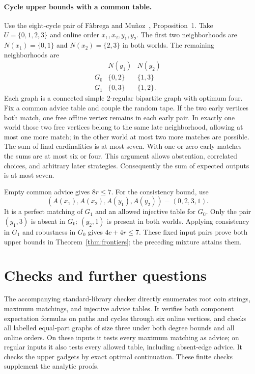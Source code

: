 \paragraph{Cycle upper bounds with a common table.}
Use the eight-cycle pair of F\`abrega and Mu\~noz~\cite{FM18},
Proposition~1. Take $U=\{0,1,2,3\}$ and online order $x_1,x_2,y_1,y_2$.
The first two neighborhoods are $N(x_1)=\{0,1\}$ and
$N(x_2)=\{2,3\}$ in both worlds. The remaining neighborhoods are
\[
\begin{array}{c|cc}
 &N(y_1)&N(y_2)\\ \hline
G_0&\{0,2\}&\{1,3\}\\
G_1&\{0,3\}&\{1,2\}.
\end{array}
\]
Each graph is a connected simple 2-regular bipartite graph with optimum
four. Fix a common advice table and couple the random tape. If the two
early vertices both match, one free offline vertex remains in each early
pair. In exactly one world those two free vertices belong to the same late
neighborhood, allowing at most one more match; in the other world at most
two more matches are possible. The sum of final cardinalities is at most
seven. With one or zero early matches the sums are at most six or four.
This argument allows abstention, correlated choices, and arbitrary later
strategies. Consequently the sum of expected outputs is at most seven.

Empty common advice gives $8r\le7$. For the consistency bound, use
\[
 (A(x_1),A(x_2),A(y_1),A(y_2))=(0,2,3,1).
\]
It is a perfect matching of $G_1$ and an allowed injective table for $G_0$.
Only the pair $(y_1,3)$ is absent in $G_0$; $(y_2,1)$ is present in both
worlds. Applying consistency in $G_1$ and robustness in $G_0$ gives
$4c+4r\le7$. These fixed input pairs prove both upper bounds in
Theorem~\ref{thm:frontiers}; the preceding mixture attains them.

\section{Checks and further questions}
The accompanying standard-library checker directly enumerates root coin
strings, maximum matchings, and injective advice tables. It verifies both
component expectation formulas on paths and cycles through six online
vertices, and checks all labelled equal-part graphs of size three under
both degree bounds and all online orders. On these inputs it tests every
maximum matching as advice; on regular inputs it also tests every allowed
table, including absent-edge advice. It checks the upper gadgets by exact
optimal continuation. These finite checks supplement the analytic proofs.

